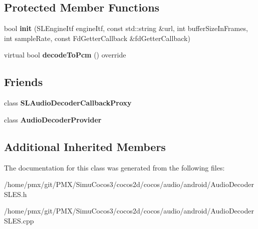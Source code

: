 \subsection*{Protected Member Functions}
\begin{DoxyCompactItemize}
\item 
\mbox{\label{classcocos2d_1_1experimental_1_1AudioDecoderSLES_a070c1069cf840164830b8cc9f8191743}} 
bool {\bfseries init} (S\+L\+Engine\+Itf engine\+Itf, const std\+::string \&url, int buffer\+Size\+In\+Frames, int sample\+Rate, const Fd\+Getter\+Callback \&fd\+Getter\+Callback)
\item 
\mbox{\label{classcocos2d_1_1experimental_1_1AudioDecoderSLES_a0c209e4a81ea4fcf014f93108851145d}} 
virtual bool {\bfseries decode\+To\+Pcm} () override
\end{DoxyCompactItemize}
\subsection*{Friends}
\begin{DoxyCompactItemize}
\item 
\mbox{\label{classcocos2d_1_1experimental_1_1AudioDecoderSLES_a9305240815b13dd312f1afe1b3d7ddd8}} 
class {\bfseries S\+L\+Audio\+Decoder\+Callback\+Proxy}
\item 
\mbox{\label{classcocos2d_1_1experimental_1_1AudioDecoderSLES_afb46984384ce8b9caa8516e0a84944ef}} 
class {\bfseries Audio\+Decoder\+Provider}
\end{DoxyCompactItemize}
\subsection*{Additional Inherited Members}


The documentation for this class was generated from the following files\+:\begin{DoxyCompactItemize}
\item 
/home/pmx/git/\+P\+M\+X/\+Simu\+Cocos3/cocos2d/cocos/audio/android/Audio\+Decoder\+S\+L\+E\+S.\+h\item 
/home/pmx/git/\+P\+M\+X/\+Simu\+Cocos3/cocos2d/cocos/audio/android/Audio\+Decoder\+S\+L\+E\+S.\+cpp\end{DoxyCompactItemize}

